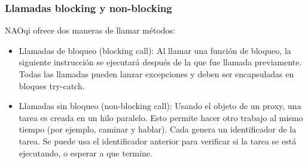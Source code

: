 \subsubsection{Llamadas blocking y non-blocking}
\label{\detokenize{chapter_one/naoqi:llamadas-blocking-y-non-blocking}}
NAOqi ofrece dos maneras de llamar métodos:
\begin{itemize}
\item {} 
Llamadas de bloqueo (blocking call): Al llamar una función de bloqueo, la siguiente instrucción se ejecutará después de la que fue llamada previamente. Todas las llamadas pueden lanzar excepciones y deben ser encapsuladas en bloques try-catch.

\item {} 
Llamadas sin bloqueo (non-blocking call): Usando el objeto  de un proxy, una tarea es creada en un hilo paralelo. Esto permite hacer otro trabajo al mismo tiempo (por ejemplo, caminar y hablar). Cada  genera un identificador de la tarea. Se puede usa el identificador anterior para verificar si la tarea se está ejecutando, o esperar a que termine.

\end{itemize}


%
%
%
%
%
%


